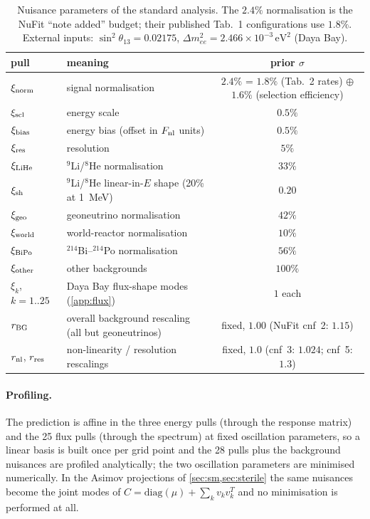 \documentclass[aps,prd,superscriptaddress,nofootinbib,longbibliography,notitlepage,11pt]{revtex4-2}
\newcommand{\dmee}{\Delta m^2_{ee}}
\begin{document}
\begin{table}[t]\centering
\begin{tabular}{llc}\toprule
pull & meaning & prior $\sigma$\\\midrule
$\xi_{\rm norm}$ & signal normalisation & $2.4\%$ = $1.8\%$ (Tab.~2 rates) $\oplus$ $1.6\%$ (selection efficiency)\\
$\xi_{\rm scl}$ & energy scale & $0.5\%$\\
$\xi_{\rm bias}$ & energy bias (offset in $F_{\rm nl}$ units) & $0.5\%$\\
$\xi_{\rm res}$ & resolution & $5\%$\\
$\xi_{\rm LiHe}$ & $^9$Li/$^8$He normalisation & $33\%$\\
$\xi_{\rm sh}$ & $^9$Li/$^8$He linear-in-$E$ shape (20\% at 1~MeV) & $0.20$\\
$\xi_{\rm geo}$ & geoneutrino normalisation & $42\%$\\
$\xi_{\rm world}$ & world-reactor normalisation & $10\%$\\
$\xi_{\rm BiPo}$ & $^{214}$Bi--$^{214}$Po normalisation & $56\%$\\
$\xi_{\rm other}$ & other backgrounds & $100\%$\\
$\xi_k$, $k=1..25$ & Daya Bay flux-shape modes (\cref{app:flux}) & $1$ each\\\midrule
$r_{\rm BG}$ & overall background rescaling (all but geoneutrinos) & fixed, $1.00$ (NuFit cnf~2: $1.15$)\\
$r_{\rm nl}$, $r_{\rm res}$ & non-linearity / resolution rescalings & fixed, $1.0$ (cnf~3: $1.024$; cnf~5: $1.3$)\\
\bottomrule\end{tabular}
\caption{Nuisance parameters of the standard analysis.  The $2.4\%$ normalisation is the
NuFit ``note added'' budget; their published Tab.~1 configurations use $1.8\%$.  External
inputs: $\sin^2\theta_{13}=0.02175$, $\dmee=2.466\times10^{-3}\,\mathrm{eV^2}$ (Daya Bay).}
\label{tab:nufit}
\end{table}

\paragraph{Profiling.}
The prediction is affine in the three energy pulls (through the response matrix) and the 25
flux pulls (through the spectrum) at fixed oscillation parameters, so a linear basis is
built once per grid point and the 28 pulls plus the background nuisances are profiled
analytically; the two oscillation parameters are minimised numerically.  In the Asimov
projections of \cref{sec:sm,sec:sterile} the same nuisances become the joint modes of
$C=\mathrm{diag}(\mu)+\sum_kv_kv_k^T$ and no minimisation is performed at all.
\end{document}
